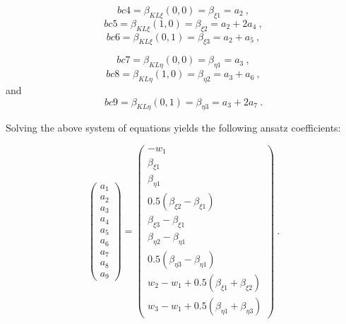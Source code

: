 \begin{equation} 
bc4 = \beta_{KL \xi}(0,0) = \beta_{\xi 1} = a_2
\label{eqDSGc3_14}\ ,
\end{equation}
\begin{equation} 
bc5 = \beta_{KL \xi}(1,0) = \beta_{\xi 2} = a_2 + 2a_4
\label{eqDSGc3_15}\ ,
\end{equation}
\begin{equation} 
bc6 = \beta_{KL \xi}(0,1) = \beta_{\xi 3} = a_2 + a_5
\label{eqDSGc3_16}\ ,
\end{equation}

\begin{equation} 
bc7 = \beta_{KL \eta}(0,0) = \beta_{\eta 1} = a_3
\label{eqDSGc3_17}\ ,
\end{equation}
\begin{equation} 
bc8 = \beta_{KL \eta}(1,0) = \beta_{\eta 2} = a_3 + a_6
\label{eqDSGc3_18}\ ,
\end{equation}
and
\begin{equation} 
bc9 = \beta_{KL \eta}(0,1) = \beta_{\eta 3} = a_3 + 2a_7
\label{eqDSGc3_19}\ .
\end{equation}

Solving the above system of equations yields the following ansatz coefficients:

\begin{equation} 
\begin{pmatrix}
a_1 \\
a_2 \\
a_3 \\
a_4 \\
a_5 \\
a_6 \\
a_7 \\
a_8 \\
a_9
\end{pmatrix}
=
\begin{pmatrix}
-w_1 \\
\beta_{\xi 1} \\
\beta_{\eta 1} \\
0.5(\beta_{\xi 2} - \beta_{\xi 1}) \\
\beta_{\xi 3} - \beta_{\xi 1} \\
\beta_{\eta 2} - \beta_{\eta 1} \\
0.5(\beta_{\eta 3} - \beta_{\eta 1}) \\
w_2 - w_1 + 0.5(\beta_{\xi 1} + \beta_{\xi 2}) \\
w_3 - w_1 + 0.5(\beta_{\eta 1} + \beta_{\eta 3}) 
\end{pmatrix}
\label{eqDSGc3_20}\ .
\end{equation}

